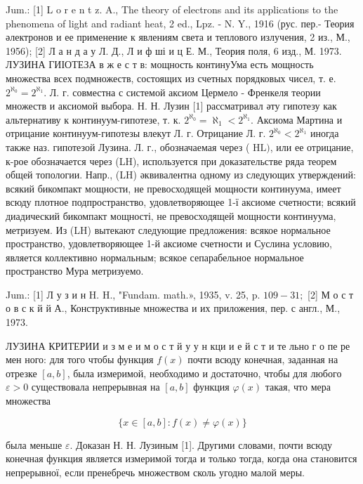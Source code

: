 \documentclass[10pt]{article}
\begin{document}
Jum.: [1] L o r e n t z. A., The theory of electrons and its applications to the phenomena of light and radiant heat, 2 ed., Lpz. - N. Y., 1916 (рус. пер.- Теория әлектронов и ее применение к явлениям света и теплового излучения, 2 из., М., 1956); [2] Л а н д а у Л. Д., Л и ф ші и ц Е. М., Теория поля, 6 изд., М. 1973. ЛУЗИНА ГИІОТЕЗА в ж е с т в: мощность континуУма есть мощность множества всех подмножеств, состоящих из счетных порядковых чисел, т. е. $2^{\aleph_{0}}=2^{\aleph_{1}}$. Л. г. совместна с системой аксиом Цермело - Френкеля теории множеств и аксиомой выбора. Н. Н. Лузин [1] рассматривал әту гипотезу как альтернативу к континуум-гипотезе, т. к. $2^{\aleph_{0}}=\aleph_{1}<2^{\aleph_{1}}$. Аксиома Мартина и отрицание континуум-гипотезы влекут Л. г. Отрицание Л. г. $2^{\aleph_{0}}<2^{\aleph_{1}}$ иногда также наз. гипотезой Лузина. Л. г., обозначаемая через ( $\mathrm{HL})$, или ее отрицание, к-рое обозначается через (LH), используется при доказательстве ряда теорем общей топологии. Напр., (LH) әквивалентна одному из следующих утверждений: всякий бикомпакт мощности, не превосходящей мощности континуума, имеет всюду плотное подпространство, удовлетворяющее 1-ї аксиоме счетности; всякий диадический бикомпакт мощності, не превосходящей мощности континуума, метризуем. Из (LH) вытекают следующие предложения: всякое нормальное пространство, удовлетворяющее 1-й аксиоме счетности и Суслина условию, является коллективно нормальным; всякое сепарабельное нормальное пространство Мура метризуемо.



Jum.: [1] Л у з и н H. H., "Fundam. math.», 1935, v. 25, p. $109-31 ;$ [2] М о с т о в с к й й А., Конструктивные множества и их приложения, пер. с англ., М., 1973.



ЛУЗИНА КРИТЕРИИ и з м е и м о с т й у у н кци и е й с т и те льно г о пе ре мен ного: для того чтобы функция $f(x)$ почти всюду конечная, заданная на отрезке $[a, b]$, была измеримой, необходимо и достаточно, чтобы для любого $\varepsilon>0$ существовала непрерывная на $[a, b]$ функция $\varphi(x)$ такая, что мера множества



\[

\{x \in[a, b]: f(x) \neq \varphi(x)\}

\]



была меньше $\varepsilon$. Доказан Н. Н. Лузиным [1]. Другими словами, почти всюду конечная функция является измеримой тогда и только тогда, когда она становится непрерывної, если пренебречь множеством сколь угодно малой меры.
\end{document}
